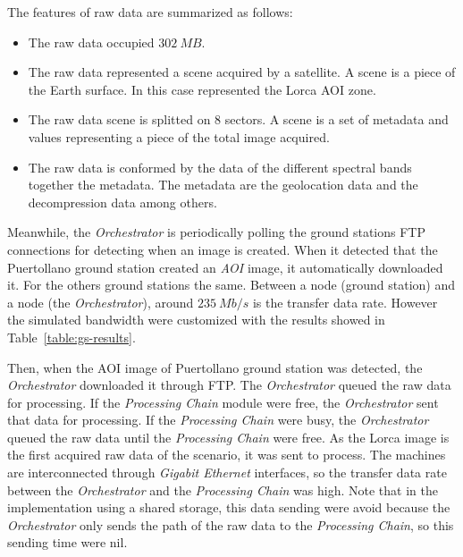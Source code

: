 The features of raw data are summarized as follows:
\begin{itemize}
\item The raw data occupied $302~MB$. 
\item The raw data represented a scene acquired by a satellite. A scene is a
  piece of the Earth surface. In this case represented the Lorca \ac{AOI} zone.
\item The raw data scene is splitted on 8 sectors. A scene is a set of metadata and
  values representing a piece of the total image acquired.
\item The raw data is conformed by the data of the different spectral bands
  together the metadata. The metadata are the geolocation data and the
  decompression data among others.
\end{itemize}


Meanwhile, the \emph{Orchestrator} is periodically polling the ground stations
\ac{FTP} connections for detecting when an image is created. When it detected that the Puertollano ground station created an \emph{AOI}
image, it automatically downloaded it. For the others ground stations the
same. Between a \vw node (ground station) and a \bonfire
node (the \emph{Orchestrator}), around $235~Mb/s$ is the transfer data rate. However the simulated
bandwidth were customized with the results
showed in Table~\ref{table:gs-results}. 

Then, when the \ac{AOI} image of Puertollano ground station was detected, the
\emph{Orchestrator} downloaded it through \ac{FTP}. The \emph{Orchestrator}
queued the raw data for processing. If the \emph{Processing Chain} module were free,
the \emph{Orchestrator} sent that data for processing. If the
\emph{Processing Chain} were busy, the \emph{Orchestrator} queued the raw data until
the \emph{Processing Chain} were free. 
As the Lorca image is the first acquired raw data of the scenario, it was sent to
process. The \bonfire machines are interconnected through  \emph{Gigabit Ethernet}
interfaces, so the transfer data rate between the  \emph{Orchestrator} and the
\emph{Processing Chain} was high. Note that in the implementation using a shared storage,
this data sending were avoid because the \emph{Orchestrator} only sends the path
of the raw data to the \emph{Processing Chain}, so this sending time were nil.

